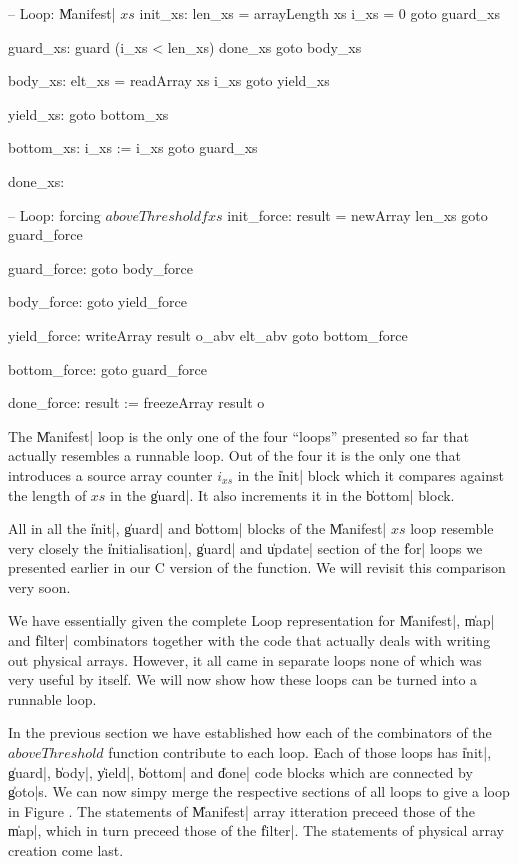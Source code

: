 \documentclass[preamble.tex]{subfiles}
\begin{document}
\begin{loopcode}
  -- Loop: \|Manifest| $xs$
  init_xs:
    len_xs = arrayLength xs
    i_xs = 0
    goto guard_xs

  guard_xs:
    guard (i_xs < len_xs) done_xs
    goto body_xs

  body_xs:
    elt_xs = readArray xs i_xs
    goto yield_xs

  yield_xs:
    goto bottom_xs

  bottom_xs:
    i_xs := i_xs
    goto guard_xs

  done_xs:


  -- Loop: forcing $aboveThreshold f xs$
  init_force:
    result = newArray len_xs
    goto guard_force

  guard_force:
    goto body_force

  body_force:
    goto yield_force

  yield_force:
    writeArray result o_abv elt_abv
    goto bottom_force

  bottom_force:
    goto guard_force

  done_force:
    result := freezeArray result o
\end{loopcode}

The \|Manifest| loop is the only one of the four ``loops'' presented so far that actually resembles a runnable loop. Out of the four it is the only one that introduces a source array counter $i_{xs}$ in the \|init| block which it compares against the length of $xs$ in the \|guard|. It also increments it in the \|bottom| block.

All in all the \|init|, \|guard| and \|bottom| blocks of the \|Manifest| $xs$ loop resemble very closely the \|initialisation|, \|guard| and \|update| section of the \|for| loops we presented earlier in our C version of the function. We will revisit this comparison very soon.

We have essentially given the complete Loop representation for \|Manifest|, \|map| and \|filter| combinators together with the code that actually deals with writing out physical arrays. However, it all came in separate loops none of which was very useful by itself. We will now show how these loops can be turned into a runnable loop.


In the previous section we have established how each of the combinators of the $aboveThreshold$ function contribute to each loop. Each of those loops has \|init|, \|guard|, \|body|, \|yield|, \|bottom| and \|done| code blocks which are connected by \|goto|s. We can now simpy merge the respective sections of all loops to give a loop in Figure . The statements of \|Manifest| array itteration preceed those of the \|map|, which in turn preceed those of the \|filter|. The statements of physical array creation come last.
\end{document}
